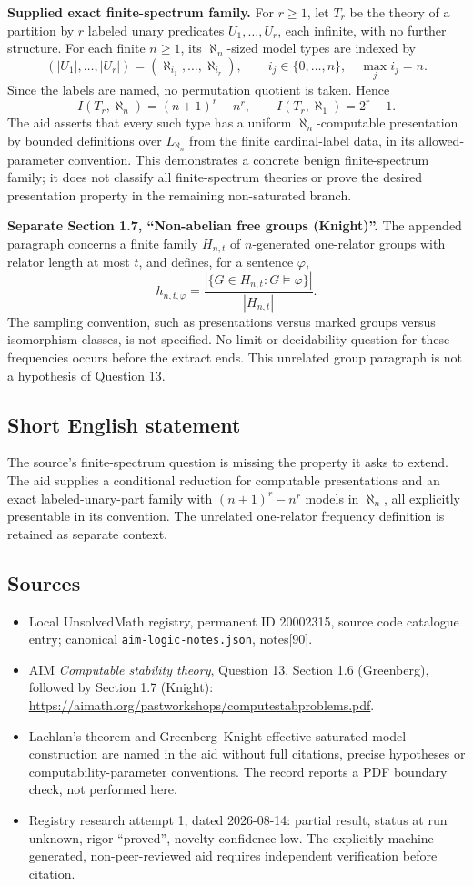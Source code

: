 \documentclass[11pt]{article}
\begin{document}
\textbf{Supplied exact finite-spectrum family.} For $r\ge1$, let $T_r$ be the theory of a partition by $r$ labeled unary predicates $U_1,\ldots,U_r$, each infinite, with no further structure. For each finite $n\ge1$, its $\aleph_n$-sized model types are indexed by
\[
 (|U_1|,\ldots,|U_r|)
  =(\aleph_{i_1},\ldots,\aleph_{i_r}),\qquad
 i_j\in\{0,\ldots,n\},\quad\max_j i_j=n.
\]
Since the labels are named, no permutation quotient is taken. Hence
\[
 I(T_r,\aleph_n)=(n+1)^r-n^r,
 \qquad I(T_r,\aleph_1)=2^r-1.
\]
The aid asserts that every such type has a uniform $\aleph_n$-computable presentation by bounded definitions over $L_{\aleph_n}$ from the finite cardinal-label data, in its allowed-parameter convention. This demonstrates a concrete benign finite-spectrum family; it does not classify all finite-spectrum theories or prove the desired presentation property in the remaining non-saturated branch.

\textbf{Separate Section 1.7, ``Non-abelian free groups (Knight)''.} The appended paragraph concerns a finite family $H_{n,t}$ of $n$-generated one-relator groups with relator length at most $t$, and defines, for a sentence $\varphi$,
\[
 h_{n,t,\varphi}=
   \frac{|\{G\in H_{n,t}:G\models\varphi\}|}{|H_{n,t}|}.
\]
The sampling convention, such as presentations versus marked groups versus isomorphism classes, is not specified. No limit or decidability question for these frequencies occurs before the extract ends. This unrelated group paragraph is not a hypothesis of Question 13.
\subsection{Short English statement}
The source's finite-spectrum question is missing the property it asks to extend. The aid supplies a conditional reduction for computable presentations and an exact labeled-unary-part family with $(n+1)^r-n^r$ models in $\aleph_n$, all explicitly presentable in its convention. The unrelated one-relator frequency definition is retained as separate context.
\subsection{Sources}
\begin{itemize}
\item Local UnsolvedMath registry, permanent ID 20002315, source code catalogue entry; canonical \texttt{aim-logic-notes.json}, notes[90].
\item AIM \emph{Computable stability theory}, Question 13, Section 1.6 (Greenberg), followed by Section 1.7 (Knight): \url{https://aimath.org/pastworkshops/computestabproblems.pdf}.
\item Lachlan's theorem and Greenberg--Knight effective saturated-model construction are named in the aid without full citations, precise hypotheses or computability-parameter conventions. The record reports a PDF boundary check, not performed here.
\item Registry research attempt 1, dated 2026-08-14: partial result, status at run unknown, rigor ``proved'', novelty confidence low. The explicitly machine-generated, non-peer-reviewed aid requires independent verification before citation.
\end{itemize}
\end{document}
